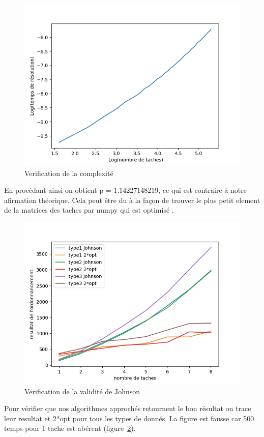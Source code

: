 \documentclass[a4paper, 10pt]{article}
\begin{document}
                \begin{figure}[H]
			\centering
			\includegraphics[width=0.8\linewidth]{graphes/verification_Johnson.png}
			\caption{Verification de la complexité}
			\label{fig:??}
		\end{figure}
                En procédant ainsi on obtient p = 1.14227148219, ce qui est contraire à notre afirmation théorique. Cela peut être du à la façon de trouver le plus petit element de la matrices des taches par numpy qui est optimisé .
                
		
		\begin{figure}[H]
			\centering
			\includegraphics[width=0.8\linewidth]{graphes/verifValiditeJohnson.png}
			\caption{Verification de la validité de Johnson}
			\label{fig:validiteJ}
		\end{figure}
                
		
		Pour vérifier que nos algorithmes approchés retournent le bon résultat on trace leur resultat et 2*opt pour tous les types de donnés. La figure est fausse car 500 temps pour 1 tache est abérent (figure~\ref{fig:validiteJ}).
		
\end{document}
